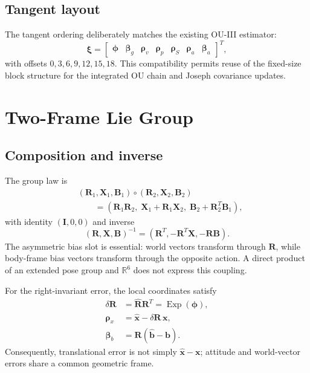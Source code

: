 \documentclass[conference]{IEEEtran}
\newcommand{\R}{\mathbb{R}}
\DeclareMathOperator{\Exp}{Exp}
\theoremstyle{bodysmall}
\begin{document}
\subsection{Tangent layout}
The tangent ordering deliberately matches the existing OU-III estimator:
\begin{equation}
\bm{\xi}=\begin{bmatrix}
\bm{\phi}&\bm{\beta}_g&\bm{\rho}_v&\bm{\rho}_p&\bm{\rho}_S&\bm{\rho}_a&\bm{\beta}_a
\end{bmatrix}^{T},
\end{equation}
with offsets $0,3,6,9,12,15,18$. This compatibility permits reuse of the fixed-size block structure for the integrated OU chain and Joseph covariance updates.

\section{Two-Frame Lie Group}
\subsection{Composition and inverse}
The group law is
\begin{align}
&(\bm{R}_1,\bm{X}_1,\bm{B}_1)\circ(\bm{R}_2,\bm{X}_2,\bm{B}_2) \nonumber\\
&\qquad=\left(\bm{R}_1\bm{R}_2,\;\bm{X}_1+\bm{R}_1\bm{X}_2,\;\bm{B}_2+\bm{R}_2^T\bm{B}_1\right),
\end{align}
with identity $(\bm{I},0,0)$ and inverse
\begin{equation}
(\bm{R},\bm{X},\bm{B})^{-1}=\left(\bm{R}^T,-\bm{R}^T\bm{X},-\bm{R}\bm{B}\right).
\end{equation}
The asymmetric bias slot is essential: world vectors transform through $\bm{R}$, while body-frame bias vectors transform through the opposite action. A direct product of an extended pose group and $\R^6$ does not express this coupling.

For the right-invariant error, the local coordinates satisfy
\begin{align}
\delta \bm{R} &= \hat {\bm{R}} \bm{R}^T=\Exp(\bm{\phi}),\\
\bm{\rho}_x &= \hat {\bm{x}}-\delta \bm{R}\,\bm{x},\\
\bm{\beta}_b &= \bm{R}(\hat {\bm{b}}-\bm{b}).
\end{align}
Consequently, translational error is not simply $\hat {\bm{x}}-\bm{x}$; attitude and world-vector errors share a common geometric frame.
\end{document}
